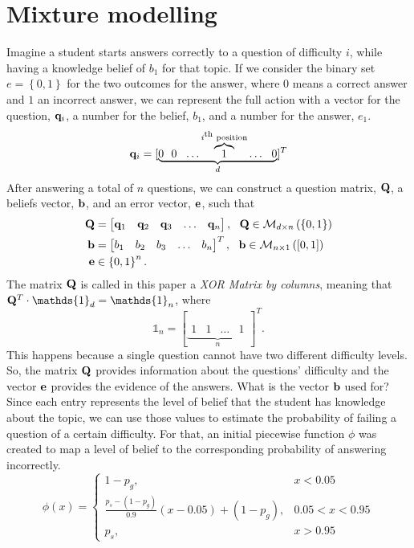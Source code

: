 \documentclass{article}
\newcommand{\0}{\mathbbold{0}}
\newcommand{\1}{\mathds{1}}
\begin{document}
\section{Mixture modelling}
Imagine a student starts answers correctly to a question of difficulty $i$, while having a knowledge belief of $b_1$ for that topic.
If we consider the binary set $e = \left\{0,1\right\}$ for the two outcomes for the answer, where $0$ means a correct answer and $1$ an incorrect answer,
we can represent the full action with a vector for the question, ${\bf q}_i$, a number for the belief, $b_1$, and a number for the answer, $e_1$.
\[ {\bf q}_i = [\underbrace{0 ~~ 0 ~~ \hdots \overbrace{1}^{i\textsuperscript{th}\text{ position}} \hdots ~~ 0}_d]^T \]
After answering a total of $n$ questions, we can construct a question matrix, ${\bf Q}$, a beliefs vector, ${\bf b}$, and an error vector, ${\bf e}$, such that
\begin{align*}
    {\bf Q} &= \begin{bmatrix}
        {\bf q}_1 & {\bf q}_2 & {\bf q}_3 & \hdots & {\bf q}_n
    \end{bmatrix}, ~~ {\bf Q} \in \mathcal{M}_{d\times n}\left(\left\{0,1\right\}\right) \\
    {\bf b} &= \begin{bmatrix}
        b_1 & b_2 & b_3 & \hdots & b_n
    \end{bmatrix}^T, ~~ {\bf b} \in \mathcal{M}_{n\times 1}\left([0,1]\right) \\
    {\bf e} &\in \left\{0,1\right\}^n.
\end{align*}
The matrix ${\bf Q}$ is called in this paper a \textsl{XOR Matrix by columns}, meaning that ${\bf Q}^T \cdot \1_d = \1_n$, where
$$ \1_n = [\underbrace{\begin{matrix}
        1 & 1 & \hdots & 1
    \end{matrix}}_n]^T. $$
This happens because a single question cannot have two different difficulty levels.
So, the matrix ${\bf Q}$ provides information about the questions' difficulty and the vector ${\bf e}$ provides the evidence of the answers.
What is the vector ${\bf b}$ used for? Since each entry represents the level of belief that the student has knowledge about the topic,
we can use those values to estimate the probability of failing a question of a certain difficulty.
For that, an initial piecewise function $\phi$ was created to map a level of belief to the corresponding probability of answering incorrectly.
$$ \phi(x) = \begin{cases*}
    1 - p_g, & x < 0.05 \\
    \frac{p_s - (1 - p_g)}{0.9}(x - 0.05) + (1 - p_g), & 0.05 < x < 0.95 \\
    p_s, & x > 0.95 
\end{cases*} $$
\end{document}
